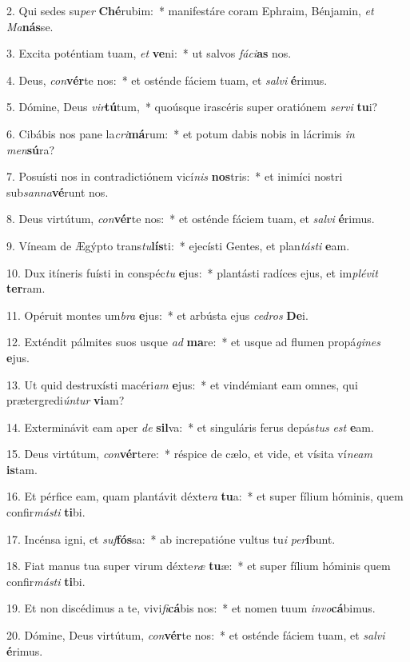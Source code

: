 2. Qui sedes su\textit{per} \textbf{Ché}rubim:~*  manifestáre coram Ephraim, Bénjamin, \textit{et} \textit{Ma}\textbf{nás}se.\

3. Excita poténtiam tuam, \textit{et} \textbf{ve}ni:~*  ut salvos \textit{fá}\textit{ci}\textbf{as} nos.\

4. Deus, \textit{con}\textbf{vér}te nos:~*  et osténde fáciem tuam, et \textit{sal}\textit{vi} \textbf{é}rimus.\

5. Dómine, Deus \textit{vir}\textbf{tú}tum,~*  quoúsque irascéris super oratiónem \textit{ser}\textit{vi} \textbf{tu}i?\

6. Cibábis nos pane la\textit{cri}\textbf{má}rum:~*  et potum dabis nobis in lácrimis \textit{in} \textit{men}\textbf{sú}ra?\

7. Posuísti nos in contradictiónem vicí\textit{nis} \textbf{nos}tris:~*  et inimíci nostri sub\textit{san}\textit{na}\textbf{vé}runt nos.\

8. Deus virtútum, \textit{con}\textbf{vér}te nos:~*  et osténde fáciem tuam, et \textit{sal}\textit{vi} \textbf{é}rimus.\

9. Víneam de Ægýpto trans\textit{tu}\textbf{lís}ti:~*  ejecísti Gentes, et plan\textit{tás}\textit{ti} \textbf{e}am.\

10. Dux itíneris fuísti in conspéc\textit{tu} \textbf{e}jus:~*  plantásti radíces ejus, et im\textit{plé}\textit{vit} \textbf{ter}ram.\

11. Opéruit montes um\textit{bra} \textbf{e}jus:~*  et arbústa ejus \textit{ce}\textit{dros} \textbf{De}i.\

12. Exténdit pálmites suos usque \textit{ad} \textbf{ma}re:~*  et usque ad flumen propá\textit{gi}\textit{nes} \textbf{e}jus.\

13. Ut quid destruxísti macéri\textit{am} \textbf{e}jus:~*  et vindémiant eam omnes, qui prætergredi\textit{ún}\textit{tur} \textbf{vi}am?\

14. Exterminávit eam aper \textit{de} \textbf{sil}va:~*  et singuláris ferus depás\textit{tus} \textit{est} \textbf{e}am.\

15. Deus virtútum, \textit{con}\textbf{vér}tere:~*  réspice de cælo, et vide, et vísita ví\textit{ne}\textit{am} \textbf{is}tam.\

16. Et pérfice eam, quam plantávit déxte\textit{ra} \textbf{tu}a:~*  et super fílium hóminis, quem confir\textit{más}\textit{ti} \textbf{ti}bi.\

17. Incénsa igni, et \textit{suf}\textbf{fós}sa:~*  ab increpatióne vultus tu\textit{i} \textit{per}\textbf{í}bunt.\

18. Fiat manus tua super virum déxte\textit{ræ} \textbf{tu}æ:~*  et super fílium hóminis quem confir\textit{más}\textit{ti} \textbf{ti}bi.\

19. Et non discédimus a te, vivi\textit{fi}\textbf{cá}bis nos:~*  et nomen tuum \textit{in}\textit{vo}\textbf{cá}bimus.\

20. Dómine, Deus virtútum, \textit{con}\textbf{vér}te nos:~*  et osténde fáciem tuam, et \textit{sal}\textit{vi} \textbf{é}rimus.\

